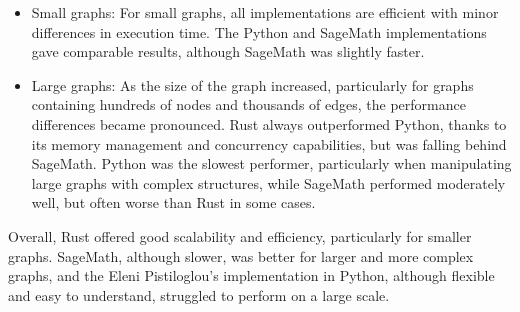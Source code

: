 \begin{itemize}
    \item Small graphs: For small graphs, all implementations are efficient with minor differences in execution time.
    The Python and SageMath implementations gave comparable results, although SageMath was slightly faster.
    \item Large graphs: As the size of the graph increased, particularly for graphs containing hundreds of nodes and thousands of edges, the performance differences became pronounced.
    Rust always outperformed Python, thanks to its memory management and concurrency capabilities, but was falling behind SageMath.
    Python was the slowest performer, particularly when manipulating large graphs with complex structures, while SageMath performed moderately well, but often worse than Rust in some cases.
\end{itemize}

Overall, Rust offered good scalability and efficiency, particularly for smaller graphs.
SageMath, although slower, was better for larger and more complex graphs, and the Eleni Pistiloglou's implementation in Python, although flexible and easy to understand, struggled to perform on a large scale.
